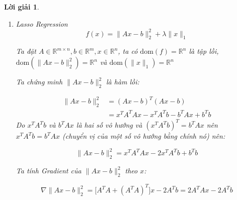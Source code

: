 \documentclass[14pt, a4paper]{article}
\theoremstyle{sltheorem}
\theoremstyle{soltheorem}
\newtheorem*{loigiai}{Lời giải}
\begin{document}
\begin{loigiai}
\begin{enumerate} [wide, labelwidth=!, labelindent=0pt,label=\textbf{\arabic*}.]
            Ta xét:

            \begin{equation*}
                p^T \nabla^2 f(x) p = 2 p^T A^T A p + 2\lambda p^Tp = 2 (Ap)^TAp + 2\lambda p^Tp \geq 0 \thickspace\forall \thickspace p \in \mathbb{R}^{n}
            \end{equation*}

            nên:

            \begin{equation*}
                \nabla^2 f(x) \succeq 0
            \end{equation*}

            Vì $\mathrm{dom}(f)$ là tập lồi và $\nabla^2 f(x) \succeq 0$ nên hàm $f(x)$ là một hàm lồi.

            \item Lasso Regression
            \begin{equation*}
                f(x)=\lVert Ax - b \rVert_2^2 + \lambda \lVert x \rVert_1
            \end{equation*}

            Ta đặt $A \in \mathbb{R}^{m \times n}, b \in \mathbb{R}^{m}, x \in \mathbb{R}^{n}$, ta có $\mathrm{dom}(f)=\mathbb{R}^{n}$ là tập lồi,
            $\mathrm{dom}(\lVert Ax - b \rVert_2^2)=\mathbb{R}^n$ và $\mathrm{dom}(\lVert x \rVert_1)=\mathbb{R}^n$

            Ta chứng minh $\lVert Ax - b \rVert_2^2$ là hàm lồi:

            \begin{equation*}
                \begin{aligned}
                    \lVert Ax - b \rVert_2^2&=(Ax-b)^T(Ax-b)\\
                    &=x^TA^TAx - x^TA^Tb - b^TAx + b^Tb
                \end{aligned}
            \end{equation*}
            Do $x^TA^Tb$ và $b^TAx$ là hai số vô hướng và $(x^TA^Tb)^T=b^TAx$ nên $x^TA^Tb=b^TAx$ (chuyển vị của một số vô hướng bằng chính nó) nên:

            \begin{equation*}
                \lVert Ax - b \rVert_2^2=x^TA^TAx - 2x^TA^Tb + b^Tb
            \end{equation*}

            Ta tính Gradient của $\lVert Ax - b \rVert_2^2$ theo $x$:

            \begin{equation*}
                \nabla \lVert Ax - b \rVert_2^2=\Big \lbrack A^TA + (A^TA)^T \Big \rbrack x-2A^Tb=2A^TAx - 2A^Tb
            \end{equation*}


\end{enumerate}
\end{loigiai}
\end{document}
